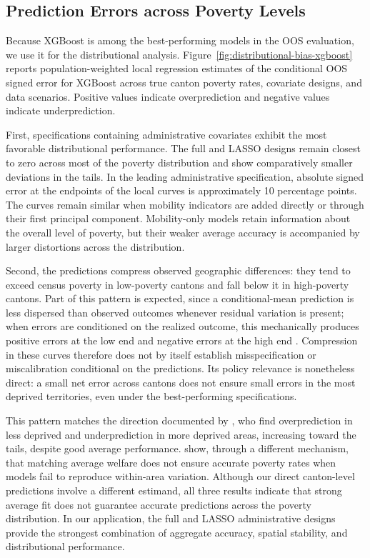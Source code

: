 \documentclass[pdflatex,sn-apa]{sn-jnl}
\begin{document}
\subsection{Prediction Errors across Poverty Levels}

Because XGBoost is among the best-performing models in the OOS evaluation, we use it for the distributional analysis. Figure~\ref{fig:distributional-bias-xgboost} reports population-weighted local regression estimates of the conditional OOS signed error for XGBoost across true canton poverty rates, covariate designs, and data scenarios. Positive values indicate overprediction and negative values indicate underprediction.

First, specifications containing administrative covariates exhibit the most favorable distributional performance. The full and LASSO designs remain closest to zero across most of the poverty distribution and show comparatively smaller deviations in the tails. In the leading administrative specification, absolute signed error at the endpoints of the local curves is approximately 10 percentage points. The curves remain similar when mobility indicators are added directly or through their first principal component. Mobility-only models retain information about the overall level of poverty, but their weaker average accuracy is accompanied by larger distortions across the distribution.

Second, the predictions compress observed geographic differences: they tend to exceed census poverty in low-poverty cantons and fall below it in high-poverty cantons. Part of this pattern is expected, since a conditional-mean prediction is less dispersed than observed outcomes whenever residual variation is present; when errors are conditioned on the realized outcome, this mechanically produces positive errors at the low end and negative errors at the high end \citep{Hastie2009}. Compression in these curves therefore does not by itself establish misspecification or miscalibration conditional on the predictions. Its policy relevance is nonetheless direct: a small net error across cantons does not ensure small errors in the most deprived territories, even under the best-performing specifications.

This pattern matches the direction documented by \citet{Corral2025}, who find overprediction in less deprived and underprediction in more deprived areas, increasing toward the tails, despite good average performance. \citet{CorralRodas2025Aggregation} show, through a different mechanism, that matching average welfare does not ensure accurate poverty rates when models fail to reproduce within-area variation. Although our direct canton-level predictions involve a different estimand, all three results indicate that strong average fit does not guarantee accurate predictions across the poverty distribution. In our application, the full and LASSO administrative designs provide the strongest combination of aggregate accuracy, spatial stability, and distributional performance.
\end{document}
